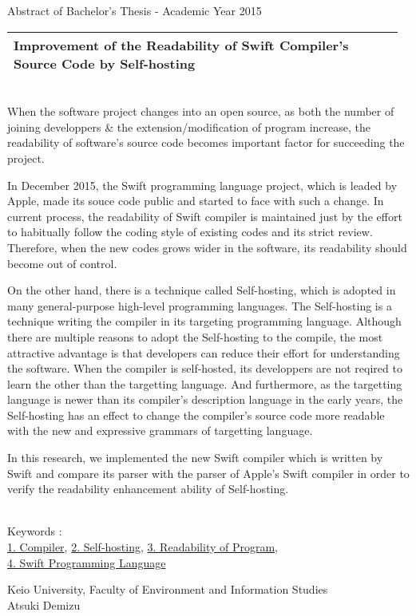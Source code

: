 Abstract of Bachelor's Thesis - Academic Year 2015
\begin{center}
\begin{large}
\begin{tabular}{|p{0.97\linewidth}|}
    \hline
    Improvement of the Readability of Swift Compiler's Source Code by Self-hosting\\
    \hline
\end{tabular}
\end{large}
\end{center}

~ \\

When the software project changes into an open source, as both the number of joining developpers \& the extension/modification of program increase, the readability of software's source code becomes important factor for succeeding the project.

In December 2015, the Swift programming language project, which is leaded by Apple, made its souce code public and started to face with such a change.
In current process, the readability of Swift compiler is maintained just by the effort to habitually follow the coding style of existing codes and its strict review.
Therefore, when the new codes grows wider in the software, its readability should become out of control.

On the other hand, there is a technique called Self-hosting, which is adopted in many general-purpose high-level programming languages.
The Self-hosting is a technique writing the compiler in its targeting programming language.
Although there are multiple reasons to adopt the Self-hosting to the compile, the most attractive advantage is that developers can reduce their effort for understanding the software.
When the compiler is self-hosted, its developpers are not reqired to learn the other than the targetting language.
And furthermore, as the targetting language is newer than its compiler's description language in the early years, the Self-hosting has an effect to change the compiler's source code more readable with the new and expressive grammars of targetting language.

In this research, we implemented the new Swift compiler which is written by Swift and compare its parser with the parser of Apple's Swift compiler in order to verify the readability enhancement ability of Self-hosting.

~ \\
Keywords : \\
\underline{1. Compiler},
\underline{2. Self-hosting},
\underline{3. Readability of Program},\\
\underline{4. Swift Programming Language}
\begin{flushright}
Keio University, Faculty of Environment and Information Studies\\
Atsuki Demizu
\end{flushright}

